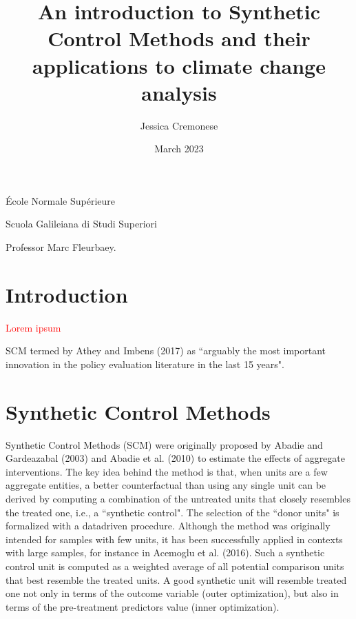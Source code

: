 \documentclass[12pt,a4paper,draft]{article}
\begin{document}
\begin{titlepage}
\title{An introduction to Synthetic Control Methods and their applications to climate change analysis}
\author{Jessica Cremonese}
\date{March 2023}
\maketitle

\vspace{2cm}

\begin{center}
    École Normale Supérieure
\end{center}

\begin{center}
    Scuola Galileiana di Studi Superiori
\end{center}

\vspace{5cm}
Professor Marc Fleurbaey.


\end{titlepage}

\tableofcontents

\newpage


\section{Introduction} %

\textcolor{red}{Lorem ipsum}

SCM termed by Athey and Imbens (2017) as ``arguably the most important innovation in the 
policy evaluation literature in the last 15 years".



\section{Synthetic Control Methods}  %

Synthetic Control Methods (SCM) were originally proposed by Abadie and Gardeazabal 
(2003) and Abadie et al. (2010) to estimate the effects of aggregate interventions.
The key idea behind the method is that, when units are a few aggregate entities, 
a better counterfactual than using any single unit can be derived by computing a 
combination of the untreated units that closely resembles the treated one, i.e., 
a ``synthetic control". 
The selection of the ``donor units" is formalized with a datadriven procedure.
Although the method was originally intended for samples with few units, it has been 
successfully applied in contexts with large samples, for instance in Acemoglu et 
al. (2016).
Such a synthetic control unit is computed as a weighted average of all potential 
comparison units that best resemble the treated units. A good synthetic unit will 
resemble treated one not only in terms of the outcome variable (outer optimization), 
but also in terms of the pre-treatment predictors value (inner optimization).
\end{document}

